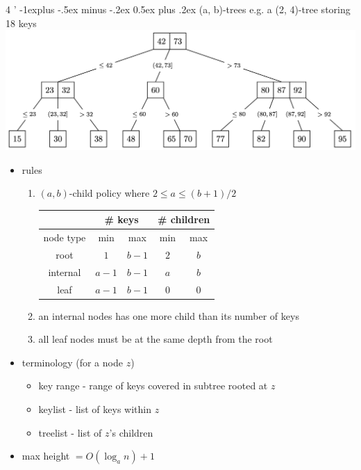 \documentclass[10pt, landscape]{article}
\makeatletter
\renewcommand{\subsection}{\@startsection{subsection}{2}{0mm}%
                                {-1explus -.5ex minus -.2ex}%
                                {0.5ex plus .2ex}%
                                {\normalfont\normalsize\bfseries}}
\makeatother
\begin{document}
\begin{multicols}{4
    '}
\subsection{(a, b)-trees}
{\scriptsize{e.g. a (2, 4)-tree storing 18 keys}}
\includegraphics[width=1\linewidth]{cs2040s-ab-tree.png}
\begin{itemize}
    \item rules
    \begin{enumerate}
        \item $(a, b)$-child policy where $2 \leq a \leq (b+1)/2$
        \begin{tabular}{|c|c|c|c|c|}
            \hline 
             & \multicolumn{2}{c|}{\# keys} & \multicolumn{2}{c|}{\# children}
            \\\hline
            node type & min & max & min & max
            \\\hline
            root & $1$ & $b-1$ & $2$ & $b$
            \\\hline
            internal & $a-1$ & $b-1$ & $a$ & $b$
            \\\hline
            leaf & $a-1$ & $b-1$ & $0$ & $0$
            \\\hline
        \end{tabular}
        \item an internal nodes has one more child than its number of keys
        \item all leaf nodes must be at the same depth from the root
    \end{enumerate}
    \item terminology (for a node $z$)
    \begin{itemize}
        \item key range - range of keys covered in subtree rooted at $z$
        \item keylist - list of keys within $z$
        \item treelist - list of $z$'s children
    \end{itemize}
    \item max height $= O(\log_an) + 1$

\end{itemize}
\end{multicols}
\end{document}

